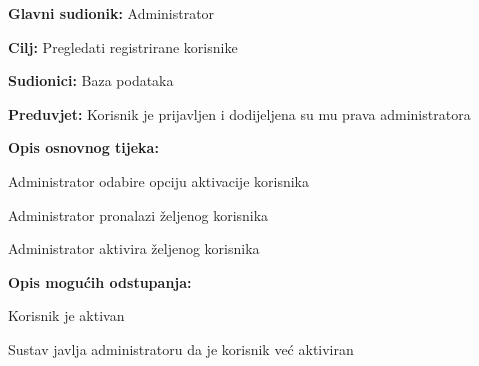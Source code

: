 				\noindent {}
					\begin{packed_item}
	
						\item \textbf{Glavni sudionik: }Administrator
						\item  \textbf{Cilj:} Pregledati registrirane korisnike
						\item  \textbf{Sudionici:} Baza podataka
						\item  \textbf{Preduvjet:} Korisnik je prijavljen i dodijeljena su mu prava administratora
						\item  \textbf{Opis osnovnog tijeka:}
						
						\item[] \begin{packed_enum}
	
							\item Administrator odabire opciju aktivacije korisnika
							\item Administrator pronalazi željenog korisnika
							\item Administrator aktivira željenog korisnika

						\end{packed_enum}
						
						\item  \textbf{Opis mogućih odstupanja:}
						
						\item[] \begin{packed_item}
	
							\item[3.a] Korisnik je aktivan
							
								\begin{packed_item}
								
									\item Sustav javlja administratoru da je korisnik već aktiviran
								
								\end{packed_item}
							
						\end{packed_item}
					\end{packed_item}
					
